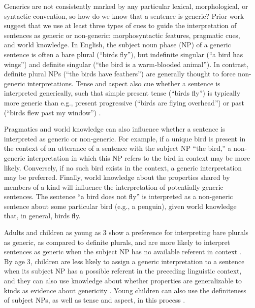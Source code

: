 \documentclass[10pt,letterpaper]{article}
\begin{document}
Generics are not consistently marked by any particular lexical, morphological, or syntactic convention, so how do we know that a sentence is generic? Prior work suggest that we use at least three types of cues to guide the interpretation of sentences as generic or non-generic: morphosyntactic features, pragmatic cues, and world knowledge. In English, the subject noun phase (NP) of a generic sentence is often a bare plural (``birds fly''), but indefinite singular (``a bird has wings'') and definite singular (``the bird is a warm-blooded animal''). In contrast, definite plural NPs (``the birds have feathers'') are generally thought to force non-generic interpretations. Tense and aspect also cue whether a sentence is interpreted generically, such that simple present tense (``birds fly'') is typically more generic than e.g., present progressive (``birds are flying overhead'') or past (``birds flew past my window'') \cite{Carlson:1977,Krifka:1995,Lyons:1977}. 

Pragmatics and world knowledge can also influence whether a sentence is interpreted as generic or non-generic. For example, if a unique bird is present in the context of an utterance of a sentence with the subject NP ``the bird,'' a non-generic interpretation in which this NP refers to the bird in context may be more likely. Conversely, if no such bird exists in the context, a generic interpretation may be preferred. Finally, world knowledge about the properties shared by members of a kind will influence the interpretation of potentially generic sentences. The sentence ``a bird does not fly'' is interpreted as a non-generic sentence about some particular bird (e.g., a penguin), given world knowledge that, in general, birds fly. 

Adults and children as young as 3 show a preference for interpreting bare plurals as generic, as compared to definite plurals, and are more likely to interpret sentences as generic when the subject NP has no available referent in context \cite{Gelman:2003}. By age 3, children are less likely to assign a generic interpretation to a sentence when its subject NP has a possible referent in the preceding linguistic context, and they can also use knowledge about whether properties are generalizable to kinds as evidence about genericity  \cite{Cimpian:2008}. Young children can also use the definiteness of subject NPs, as well as tense and aspect, in this process \cite{Cimpian:2011} .
\end{document}

